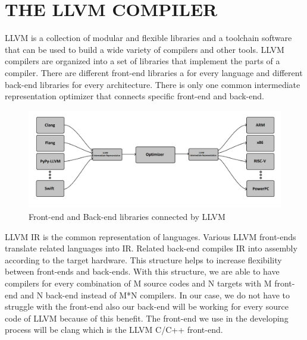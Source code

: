 \clearpage
\chapter{THE LLVM COMPILER}\label{ch:Ch3}

LLVM is a collection of modular and flexible libraries and a toolchain software that can be used to build a wide variety of compilers and other tools. LLVM compilers are organized into a set of libraries that implement the parts of a compiler. There are different front-end libraries a for every language and different back-end libraries for every architecture. There is only one common intermediate representation optimizer that connects specific front-end and back-end.

\begin{figure}
    \centering
    \includegraphics{the_llvm_compiler/llvm_diagram.png}
    \caption{Front-end and Back-end libraries connected by LLVM}
    \label{fig:llvm_diagram}
\end{figure}

LLVM IR is the common representation of languages. Various LLVM front-ends translate related languages into IR. Related back-end compiles IR into assembly according to the target hardware. This structure helps to increase flexibility between front-ends and back-ends. With this structure, we are able to have compilers for every combination of M source codes and N targets with M front-end and N back-end instead of M*N compilers. In our case, we do not have to struggle with the front-end also our back-end will be working for every source code of LLVM because of this benefit. The front-end we use in the developing process will be clang which is the LLVM C/C++ front-end\cite{clang}.

